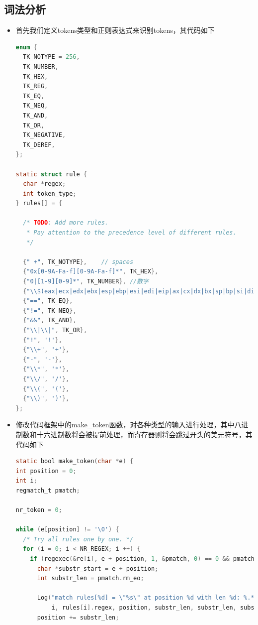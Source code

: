 \documentclass[UTF8,a4paper,10pt]{ctexart}
\begin{document}
\subsection{词法分析}
\begin{itemize}
  \item 首先我们定义tokens类型和正则表达式来识别tokens，其代码如下
  \begin{lstlisting}[language = C]
enum {
  TK_NOTYPE = 256, 
  TK_NUMBER,
  TK_HEX,
  TK_REG,
  TK_EQ,
  TK_NEQ,
  TK_AND,
  TK_OR,
  TK_NEGATIVE,
  TK_DEREF,
};

static struct rule {
  char *regex;
  int token_type;
} rules[] = {

  /* TODO: Add more rules.
   * Pay attention to the precedence level of different rules.
   */

  {" +", TK_NOTYPE},    // spaces
  {"0x[0-9A-Fa-f][0-9A-Fa-f]*", TK_HEX},
  {"0|[1-9][0-9]*", TK_NUMBER}, //数字
  {"\\$(eax|ecx|edx|ebx|esp|ebp|esi|edi|eip|ax|cx|dx|bx|sp|bp|si|di|al|cl|dl|bl|ah|ch|dh|bh)", TK_REG},
  {"==", TK_EQ},
  {"!=", TK_NEQ},
  {"&&", TK_AND},
  {"\\|\\|", TK_OR},
  {"!", '!'},
  {"\\+", '+'},         
  {"-", '-'},
  {"\\*", '*'},
  {"\\/", '/'},
  {"\\(", '('},
  {"\\)", ')'},
};
  \end{lstlisting}
  \item 修改代码框架中的make\_token函数，对各种类型的输入进行处理，其中八进制数和十六进制数将会被提前处理，而寄存器则将会跳过开头的美元符号，其代码如下
  
  \begin{lstlisting}[language = C]
static bool make_token(char *e) {
int position = 0;
int i;
regmatch_t pmatch;

nr_token = 0;

while (e[position] != '\0') {
  /* Try all rules one by one. */
  for (i = 0; i < NR_REGEX; i ++) {
    if (regexec(&re[i], e + position, 1, &pmatch, 0) == 0 && pmatch.rm_so == 0) {
      char *substr_start = e + position;
      int substr_len = pmatch.rm_eo;

      Log("match rules[%d] = \"%s\" at position %d with len %d: %.*s",
          i, rules[i].regex, position, substr_len, substr_len, substr_start);
      position += substr_len;


\end{lstlisting}
\end{itemize}
\end{document}

